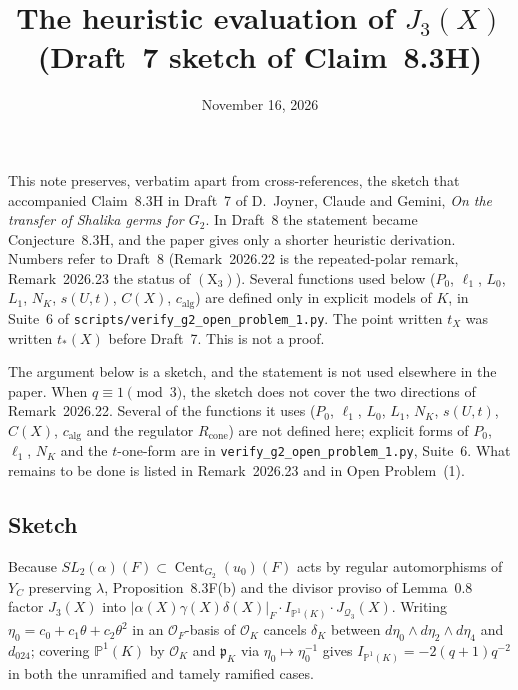 \documentclass[12pt,letterpaper]{amsart}
\title{The heuristic evaluation of $J_3(X)$ (Draft~7 sketch of Claim~8.3H)}
\date{November 16, 2026}
\newcommand{\OF}{\mathcal{O}_F}
\DeclareMathOperator{\Cent}{Cent}
\begin{document}
\maketitle

This note preserves, verbatim apart from cross-references, the sketch that
accompanied Claim~8.3H in Draft~7 of D.~Joyner, Claude and Gemini, \emph{On the
transfer of Shalika germs for $G_2$}. In Draft~8 the statement became
Conjecture~8.3H, and the paper gives only a shorter heuristic derivation.
Numbers refer to Draft~8 (Remark~2026.22 is the repeated-polar remark,
Remark~2026.23 the status of $(\mathrm X_3)$). Several functions used below
($P_0$, $\ell_1$, $L_0$, $L_1$, $N_K$, $s(U,t)$, $C(X)$, $c_{\mathrm{alg}}$)
are defined only in explicit models of $K$, in Suite~6 of
\texttt{scripts/verify\_g2\_open\_problem\_1.py}. The point written $t_X$ was
written $t_*(X)$ before Draft~7. This is not a proof.

The argument below is a sketch, and the statement is not used elsewhere in the
paper. When $q\equiv1\pmod3$, the sketch does not cover the two directions of
Remark~2026.22. Several of the functions it uses ($P_0$, $\ell_1$, $L_0$, $L_1$, $N_K$,
$s(U,t)$, $C(X)$, $c_{\mathrm{alg}}$ and the regulator $R_{\mathrm{cone}}$)
are not defined here; explicit forms of $P_0$, $\ell_1$, $N_K$ and the
$t$-one-form are in \texttt{verify\_g2\_open\_problem\_1.py}, Suite~6. What remains to be done is
listed in Remark~2026.23 and in Open Problem~(1).

\subsection*{Sketch}
Because $SL_2(\alpha)(F)\subset\Cent_{G_2}(u_0)(F)$ acts by regular
automorphisms of $Y_C$ preserving $\lambda$, Proposition~8.3F(b) and
the divisor proviso of Lemma~0.8 factor $J_3(X)$ into
$|\alpha(X)\gamma(X)\delta(X)|_F\cdot I_{\mathbb{P}^1(K)}\cdot J_{\mathcal Q_3}(X)$.
Writing $\eta_0=c_0+c_1\theta+c_2\theta^2$ in an $\OF$-basis of $\mathcal O_K$
cancels $\delta_K$ between $d\eta_0\wedge d\eta_2\wedge d\eta_4$ and $d_{024}$;
covering $\mathbb{P}^1(K)$ by $\mathcal O_K$ and $\mathfrak p_K$ via
$\eta_0\mapsto\eta_0^{-1}$ gives $I_{\mathbb{P}^1(K)}=-2(q+1)q^{-2}$ in both
the unramified and tamely ramified cases.
\end{document}
